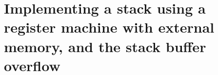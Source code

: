 
\chapter{Implementing a stack using a register machine with external memory, and the stack buffer overflow}
